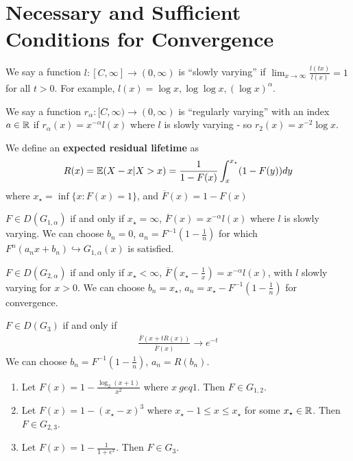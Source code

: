\section{Necessary and Sufficient Conditions for Convergence}
\label{sec:necess-suff-cond}

We say a function $l: [C, \infty] \rightarrow (0, \infty)$ is ``slowly
varying'' if $\lim_{x \rightarrow \infty} \frac{l(tx)}{l(x)} = 1$ for
all $t > 0$.  For example, $l (x) = \log x, \log \log x, (\log
x)^{\alpha}$.

We say a function $r_{\alpha}: [C, \infty) \rightarrow (0, \infty)$ is
``regularly varying'' with an index $a \in \mathbb{R}$ if $r_{\alpha}(x) =
x^{-\alpha}l(x)$ where $l$ is slowly varying - so $r_{2}(x) = x^{-2}
\log x$.

We define an \textbf{expected residual lifetime} as
\begin{align}
  \label{eq:120}
  R(x) = \E{X - x | X > x} = \frac{1}{1 - F(x)} \int_{x}^{x_{\star}}
  (1 - F(y)) dy
\end{align} where $x_{\star} = \inf \{ x : F(x) = 1 \}$, and
$\overline F(x) = 1 - F(x)$

\begin{thm}
  \label{defn:extreme_value_theory:4}
  $F \in D(G_{1, \alpha})$ if and only if $x_{\star} = \infty$,
  $\overline F(x) = x^{-\alpha} l(x)$ where $l$ is slowly varying.  We
  can choose $b_{n} = 0$, $a_{n} = F^{-1}(1 - \frac{1}{n})$ for which
  $F^{n}(a_{n} x + b_{n}) \hookrightarrow G_{1, \alpha}(x)$ is
  satisfied.

  $F \in D(G_{2, \alpha})$ if and only if $x_{\star} < \infty$,
  $\overline F(x_{\star} - \frac{1}{x} ) = x^{-\alpha} l(x)$, with $l$
  slowly varying for $x > 0$.  We can choose $b_{n} = x_{\star}$,
  $a_{n} = x_{\star} - F^{-1}(1 - \frac{1}{n})$ for convergence.

  $F \in D(G_{3})$ if and only if
  \begin{align}
    \label{eq:124}
    \frac{\overline F(x + t R(x))}{\overline F(x)}  \rightarrow e^{-t}
  \end{align} We can choose $b_{n} = F^{-1}(1 - \frac{1}{n})$, $a_{n}
  = R(b_{n})$.
\end{thm}

\begin{exmp}
  \label{sec:f-in-dg_1}
  \begin{enumerate}
  \item Let $F(x) = 1 - \frac{\log_{2}(x+1)}{x^{2}}$ where $ x\ geq
    1$. Then $F \in G_{1, 2}$.
  \item Let $F(x) = 1 - (x_{\star} - x)^{3}$ where $x_{\star} - 1 \leq
    x \leq x_{\star}$ for some $x_{\star} \in \mathbb{R}$.  Then $F \in G_{2, 3}$.
  \item Let $F(x) = 1 - \frac{1}{1 + e^{x}}$.  Then $F \in G_{3}$.
  \end{enumerate}
\end{exmp}

